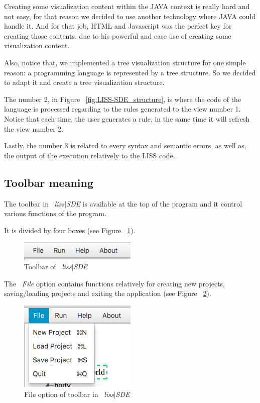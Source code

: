 \documentclass[
  oneside,
  11pt, a4paper,
  footinclude=true,
  headinclude=true,
  cleardoublepage=empty
]{scrbook}
\begin{document}
Creating some visualization content within the JAVA context is really hard and not easy, for that reason we decided to use another technology where JAVA could handle it. And for that job, HTML and Javascript was the perfect key for creating those contents, due to his powerful and ease use of creating some visualization content.

Also, notice that, we implemented a tree visualization structure for one simple reason: a programming language is represented by a tree structure. So we decided to adapt it and create a tree visualization structure.

The number 2, in Figure ~\ref{fig:LISS-SDE_structure}, is where the code of the language is processed regarding to the rules generated to the view number 1. Notice that each time, the user generates a rule, in the same time it will refresh the view number 2.

Lastly, the number 3 is related to every syntax and semantic errors, as well as, the output of the execution relatively to the LISS code.

\subsection{Toolbar meaning}

The toolbar in ~\textit{liss$|$SDE} is available at the top of the program and it control various functions of the program.

It is divided by four boxes (see Figure ~\ref{fig:LISS-SDE_toolbar_1}).

\begin{figure}[h!]
  \centering
    \includegraphics[width=0.5\textwidth]{img/LISS-SDE_toolbar_menu/ToolBar_menu1.png}
    \caption{Toolbar of ~\textit{liss$|$SDE}}
    \label{fig:LISS-SDE_toolbar_1}
\end{figure}

The ~\textit{File} option contains functions relatively for creating new projects, saving/loading projects and exiting the application (see Figure ~\ref{fig:LISS-SDE_toolbar_2}).

\begin{figure}[h!]
  \centering
    \includegraphics[width=0.5\textwidth]{img/LISS-SDE_toolbar_menu/ToolBar_menu2.png}
    \caption{File option of toolbar in ~\textit{liss$|$SDE}}
    \label{fig:LISS-SDE_toolbar_2}
\end{figure}
\end{document}
